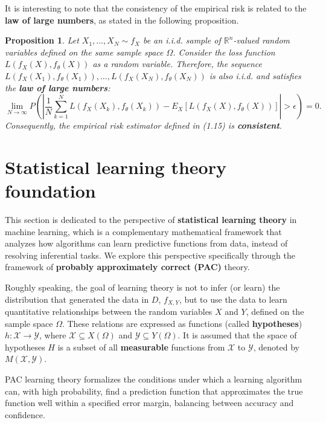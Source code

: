 \documentclass{report}
\newtheorem{proposition}{Proposition}[chapter]
\begin{document}
It is interesting to note that the consistency of the empirical risk is related to the \textbf{law of large numbers}, as stated in the following proposition.

\begin{proposition}
Let $X_1,\dots,X_N \sim f_X$ be an i.i.d. sample of $\mathbb{R}^n$-valued random variables defined on the same sample space $\Omega$. Consider the loss function $L(f_X(X), f_\theta(X))$ as a random variable. Therefore, the sequence $L(f_X(X_1),f_\theta(X_1)),\dots,L(f_X(X_N),f_\theta(X_N))$ is also i.i.d. and satisfies the \textbf{law of large numbers}:
\begin{equation}
\lim_{N\to \infty}P\left(\left|\frac{1}{N}\sum_{k=1}^NL(f_X(X_k),f_\theta(X_k)) - E_{X}[L(f_X(X),f_\theta(X))]\right| > \epsilon\right) = 0.
\end{equation}
Consequently, the empirical risk estimator defined in (1.15) is \textbf{consistent}.
\end{proposition}

\section{Statistical learning theory foundation}
This section is dedicated to the perspective of \textbf{statistical learning theory} in machine learning, which is a complementary mathematical framework that analyzes how algorithms can learn predictive functions from data, instead of resolving inferential tasks. We explore this perspective specifically through the framework of \textbf{probably approximately correct (PAC)} theory.

Roughly speaking, the goal of learning theory is not to infer (or learn) the distribution that generated the data in $D$, $f_{X,Y}$, but to use the data to learn quantitative relationships between the random variables $X$ and $Y$, defined on the sample space $\Omega$. These relations are expressed as functions (called \textbf{hypotheses}) $h : \mathcal{X} \to \mathcal{Y}$, where $\mathcal{X} \subseteq X(\Omega)$ and $\mathcal{Y} \subseteq Y(\Omega)$. It is assumed that the space of hypotheses $H$ is a subset of all \textbf{measurable} functions from $\mathcal{X}$ to $\mathcal{Y}$, denoted by $M(\mathcal{X}, \mathcal{Y})$.

PAC learning theory formalizes the conditions under which a learning algorithm can, with high probability, find a prediction function that approximates the true  function well within a specified error margin, balancing between accuracy and confidence.
\end{document}
